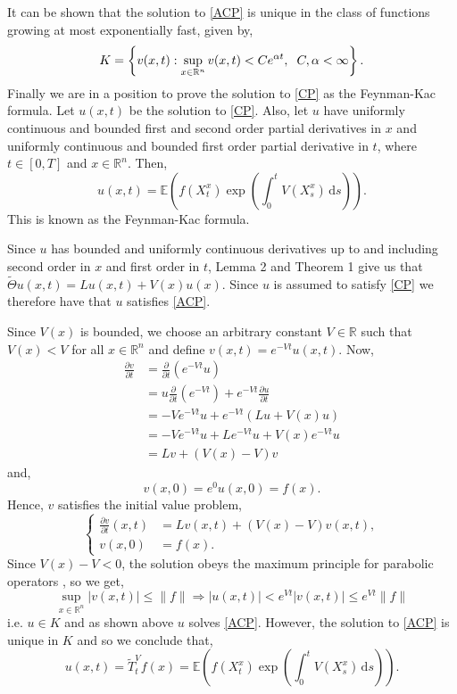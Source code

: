 \documentclass[a4paper,12pt,draft]{report}
\theoremstyle{remark}
\theoremstyle{definition}
\begin{document}
It can be shown that the solution to \eqref{ACP} is unique in the class of functions growing at most exponentially fast, given by,
$$
K = \left\{v(x, t) : \sup_{x \in \mathbb{R}^n}v(x, t) < Ce^{\alpha t}, \hspace{0.2cm} C, \alpha < \infty\right\}.
$$
Finally we are in a position to prove the solution to \eqref{CP} as the Feynman-Kac formula.
\theorem
{
Let $u(x, t)$ be the solution to \eqref{CP}.  Also, let $u$ have uniformly continuous and bounded first and second order partial derivatives in $x$ and uniformly continuous and bounded first order partial derivative in $t$, where $t \in [0, T]$ and $x \in \mathbb{R}^n$.  Then,
\begin{equation}
u(x, t) = \mathbb{E}\left(f(X_t^x)\exp\left(\int_0^t V(X_s^x)\,\mathrm{d}s\right)\right). \label{FCF}
\end{equation}
This is known as the Feynman-Kac formula.
}
\proof
{
Since $u$ has bounded and uniformly continuous derivatives up to and including second order in $x$ and first order in $t$, Lemma 2 and Theorem 1 give us that $\tilde{\Theta}u(x, t) = Lu(x, t) + V(x)u(x)$.  Since $u$ is assumed to satisfy \eqref{CP} we therefore have that $u$ satisfies \eqref{ACP}.

Since $V(x)$ is bounded, we choose an arbitrary constant $V \in \mathbb{R}$ such that $V(x) < V$ for all $x \in \mathbb{R}^n$ and define $v(x, t) = e^{-Vt}u(x, t)$.  Now,
\begin{align}
\frac{\partial v}{\partial t} & = \frac{\partial}{\partial t}(e^{-Vt}u)\nonumber\\
& = u\frac{\partial}{\partial t}(e^{-Vt}) + e^{-Vt}\frac{\partial u}{\partial t}\nonumber\\
& = -Ve^{-Vt}u + e^{-Vt}(Lu + V(x)u)\nonumber\\
& = -Ve^{-Vt}u + Le^{-Vt}u + V(x)e^{-Vt}u\nonumber\\
& = Lv + (V(x) - V)v\nonumber
\end{align}
and,
$$
v(x, 0) = e^0u(x, 0) = f(x).
$$
Hence, $v$ satisfies the initial value problem,
$$
\left\{
\begin{aligned}
\frac{\partial v}{\partial t}(x, t) & =  Lv(x, t) + (V(x) - V)v(x, t),\\ 
v(x, 0) & = f(x).
\end{aligned}
\right.
$$
Since $V(x) - V < 0$, the solution obeys the maximum principle for parabolic operators \cite{PW}, so we get,
$$
\sup_{x \in \mathbb{R}^n}|v(x, t)| \le \|f\| \Rightarrow |u(x, t)| < e^{Vt}|v(x, t)| \le e^{Vt}\|f\|
$$
i.e. $u \in K$ and as shown above $u$ solves \eqref{ACP}.  However, the solution to \eqref{ACP} is unique in $K$ and so we conclude that,
$$
u(x, t) = \tilde{T}_t^Vf(x) = \mathbb{E}\left(f(X_t^x)\exp\left(\int_0^t V(X_s^x)\,\mathrm{d}s\right)\right).
$$

\qedhere
}
\end{document}
